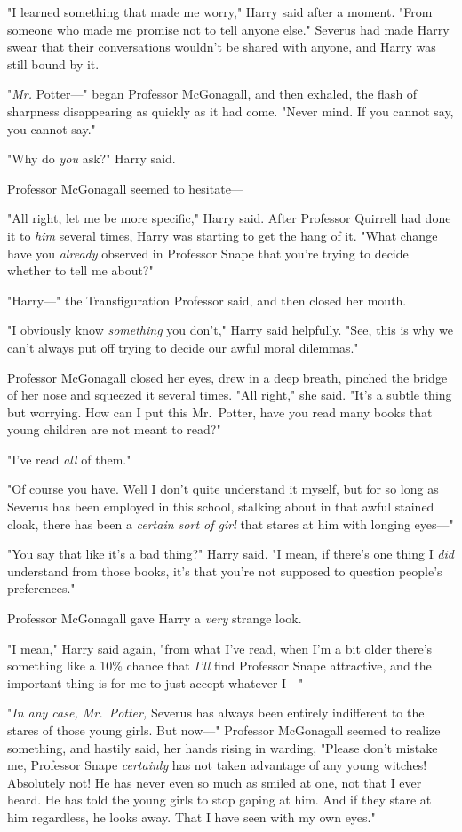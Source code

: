 "I learned something that made me worry," Harry said after a moment. "From
someone who made me promise not to tell anyone else." Severus had made Harry
swear that their conversations wouldn't be shared with anyone, and Harry was
still bound by it.

"\emph{Mr.} Potter—" began Professor McGonagall, and then exhaled, the flash
of sharpness disappearing as quickly as it had come. "Never mind. If you cannot
say, you cannot say."

"Why do \emph{you} ask?" Harry said.

Professor McGonagall seemed to hesitate—

"All right, let me be more specific," Harry said. After Professor Quirrell had
done it to \emph{him} several times, Harry was starting to get the hang of it.
"What change have you \emph{already} observed in Professor Snape that you're
trying to decide whether to tell me about?"

"Harry—" the Transfiguration Professor said, and then closed her mouth.

"I obviously know \emph{something} you don't," Harry said helpfully. "See, this
is why we can't always put off trying to decide our awful moral dilemmas."

Professor McGonagall closed her eyes, drew in a deep breath, pinched the bridge
of her nose and squeezed it several times. "All right," she said. "It's a
subtle thing{\el} but worrying. How can I put this{\el} Mr.~Potter, have
you read many books that young children are not meant to read?"

"I've read \emph{all} of them."

"Of course you have. Well{\el} I don't quite understand it myself, but for
so long as Severus has been employed in this school, stalking about in that
awful stained cloak, there has been a \emph{certain sort of girl} that stares
at him with longing eyes—"

"You say that like it's a bad thing?" Harry said. "I mean, if there's one thing
I \emph{did} understand from those books, it's that you're not supposed to
question people's preferences."

Professor McGonagall gave Harry a \emph{very} strange look.

"I mean," Harry said again, "from what I've read, when I'm a bit older there's
something like a 10\% chance that \emph{I'll} find Professor Snape attractive,
and the important thing is for me to just accept whatever I—"

"\emph{In any case, Mr.~Potter,} Severus has always been entirely indifferent
to the stares of those young girls. But now—" Professor McGonagall seemed to
realize something, and hastily said, her hands rising in warding, "Please don't
mistake me, Professor Snape \emph{certainly} has not taken advantage of any
young witches! Absolutely not! He has never even so much as smiled at one, not
that I ever heard. He has told the young girls to stop gaping at him. And if
they stare at him regardless, he looks away. That I have seen with my own eyes."

